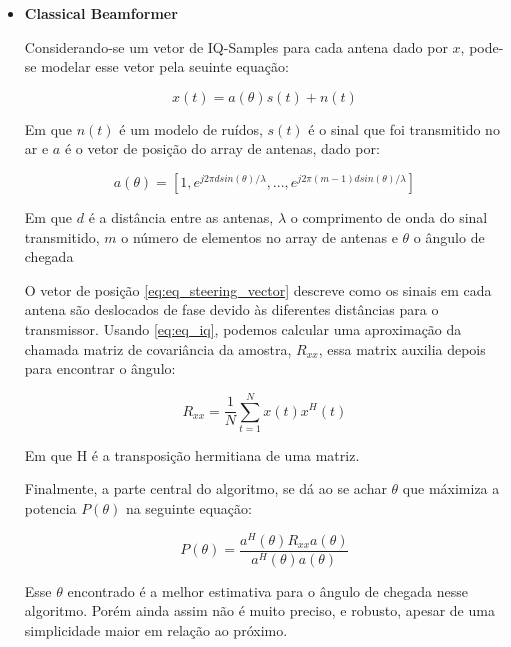 \begin{itemize}

    \item \textbf{Classical Beamformer}
    
    Considerando-se um vetor de IQ-Samples para cada antena dado por \( x \), pode-se modelar esse vetor pela seuinte equação:

    \begin{equation} \label{eq:eq_iq}
        x(t) = a(\theta)s(t) + n(t)
    \end{equation}

    Em que  \( n(t) \) é um modelo de ruídos, \( s(t) \) é o sinal que foi transmitido no ar e \( a \) é o vetor de posição do array de antenas, dado por:

    \begin{equation} \label{eq:eq_steering_vector}
        a(\theta) = [1, e^{j2\pi d sin(\theta)/\lambda}, ... , e^{j2\pi (m-1) d sin(\theta)/\lambda}]
    \end{equation}

    Em que \( d \) é a distância entre as antenas, \( \lambda \) o comprimento de onda do sinal transmitido, \( m \) o número de elementos no array de antenas e \( \theta \) o ângulo de chegada

    O vetor de posição \ref{eq:eq_steering_vector} descreve como os sinais em cada antena são deslocados de fase devido às diferentes distâncias para o transmissor. Usando \ref{eq:eq_iq}, podemos calcular uma aproximação da chamada matriz de covariância da amostra, \( R_{xx} \), essa matrix auxilia depois para encontrar o ângulo:

    \begin{equation} \label{eq:eq_Beamformer}
        R_{xx} = \frac{1}{N}\sum_{t=1}^{N}x(t)x^{H}(t)
    \end{equation}

    Em que H é a transposição hermitiana de uma matriz.

    Finalmente, a parte central do algoritmo, se dá ao se achar \( \theta \)  que máximiza a potencia \( P(\theta) \) na seguinte equação:

    \begin{equation} \label{eq:eq_rxx}
        P(\theta) = \frac{a^{H}(\theta)R_{xx}a(\theta)}{a^{H}(\theta)a(\theta)}
    \end{equation}

    Esse \( \theta \) encontrado é a melhor estimativa para o ângulo de chegada nesse algoritmo. Porém ainda assim não é muito preciso, e robusto, apesar de uma simplicidade maior em relação ao próximo.


\end{itemize}
